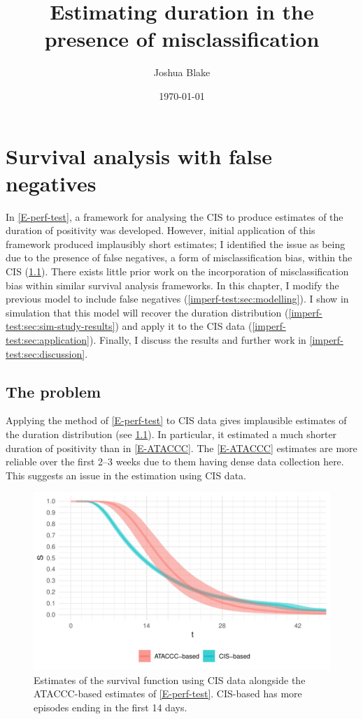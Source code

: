 \documentclass[thesis.tex]{subfiles}
\title{Estimating duration in the presence of misclassification}
\author{Joshua Blake}
\date{\today}
\begin{document}
\ifSubfilesClassLoaded{
  \setcounter{chapter}{5}
}

\chapter{Survival analysis with false negatives} \label{imperf-test}

In \cref{E-perf-test}, a framework for analysing the CIS to produce estimates of the duration of positivity was developed.
However, initial application of this framework produced implausibly short estimates; I identified the issue as being due to the presence of false negatives, a form of misclassification bias, within the CIS (\cref{imperf-test:sec:problem}).
There exists little prior work on the incorporation of misclassification bias within similar survival analysis frameworks.
In this chapter, I modify the previous model to include false negatives (\cref{imperf-test:sec:modelling}).
I show in simulation that this model will recover the duration distribution (\cref{imperf-test:sec:sim-study-results}) and apply it to the CIS data (\cref{imperf-test:sec:application}).
Finally, I discuss the results and further work in \cref{imperf-test:sec:discussion}.

\section{The problem} \label{imperf-test:sec:problem}

Applying the method of \cref{E-perf-test} to CIS data gives implausible estimates of the duration distribution (see \cref{imperf-test:fig:problem-cis-estimates}).
In particular, it estimated a much shorter duration of positivity than in \cref{E-ATACCC}.
The \cref{E-ATACCC} estimates are more reliable over the first 2--3 weeks due to them having dense data collection here.
This suggests an issue in the estimation using CIS data.
\begin{figure}
  \centering \includegraphics{cis-imperfect-testing/CIS_perfect}
  \caption[Estimating survival using CIS data assuming perfect testing]{Estimates of the survival function using CIS data alongside the ATACCC-based estimates of \cref{E-perf-test}. CIS-based has more episodes ending in the first 14 days. \label{imperf-test:fig:problem-cis-estimates}}
\end{figure}
\end{document}
